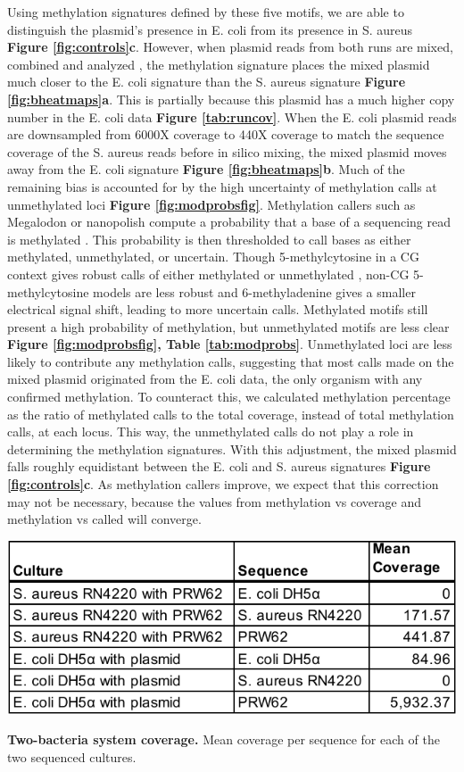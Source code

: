 Using methylation signatures defined by these five motifs, we are able to distinguish the plasmid’s presence in E. coli from its presence in S. aureus {\bf Figure \ref{fig:controls}c}. However, when plasmid reads from both runs are mixed, combined and analyzed , the methylation signature places the mixed plasmid much closer to the E. coli signature than the S. aureus signature {\bf Figure \ref{fig:bheatmaps}a}. This is partially because this plasmid has a much higher copy number in the E. coli data {\bf Figure \ref{tab:runcov}}. When the E. coli plasmid reads are downsampled from 6000X coverage to 440X coverage to match the sequence coverage of the S. aureus reads before in silico mixing, the mixed plasmid moves away from the E. coli signature {\bf Figure \ref{fig:bheatmaps}b}. Much of the remaining bias is accounted for by the high uncertainty of methylation calls at unmethylated loci {\bf Figure \ref{fig:modprobsfig}}. Methylation callers such as Megalodon or nanopolish compute a probability that a base of a sequencing read is methylated \citep{Simpson2017-wb}. This probability is then thresholded to call bases as either methylated, unmethylated, or uncertain. Though 5-methylcytosine in a CG context gives robust calls of either methylated or unmethylated \citep{Simpson2017-wb}, non-CG 5-methylcytosine models are less robust and 6-methyladenine gives a smaller electrical signal shift, leading to more uncertain calls. Methylated motifs still present a high probability of methylation, but unmethylated motifs are less clear {\bf Figure \ref{fig:modprobsfig}, Table \ref{tab:modprobs}}. Unmethylated loci are less likely to contribute any methylation calls, suggesting that most calls made on the mixed plasmid originated from the E. coli data, the only organism with any confirmed methylation. To counteract this, we calculated methylation percentage as the ratio of methylated calls to the total coverage, instead of total methylation calls, at each locus. This way, the unmethylated calls do not play a role in determining the methylation signatures. With this adjustment, the mixed plasmid falls roughly equidistant between the E. coli and S. aureus signatures {\bf Figure \ref{fig:controls}c}. As methylation callers improve, we expect that this correction may not be necessary, because the values from methylation vs coverage and methylation vs called will converge.

\begin{table}[!hb]
\centering
\includegraphics[width = .5\linewidth,keepaspectratio]{figure/runcov.pdf}
\caption[Two-bacteria system coverage]{{\bf Two-bacteria system coverage.} Mean coverage per sequence for each of the two sequenced cultures. }
\label{tab:runcov}
\end{table}



